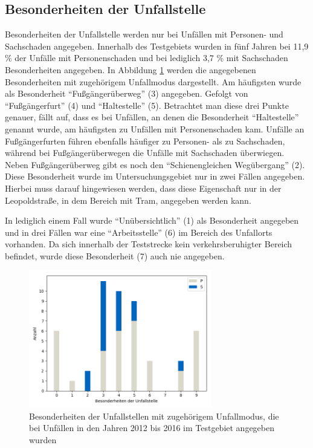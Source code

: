 \subsection{Besonderheiten der Unfallstelle}
Besonderheiten der Unfallstelle werden nur bei Unfällen mit Personen- und Sachschaden angegeben. Innerhalb des Testgebiets wurden in fünf Jahren bei 11,9 \% der Unfälle mit Personenschaden und bei lediglich 3,7 \% mit Sachschaden Besonderheiten angegeben. In Abbildung \ref{fig:BES} werden die angegebenen Besonderheiten mit zugehörigem Unfallmodus dargestellt. Am häufigsten wurde als Besonderheit \enquote{Fußgängerüberweg} (3) angegeben. Gefolgt von \enquote{Fußgängerfurt} (4) und \enquote{Haltestelle} (5). Betrachtet man diese drei Punkte genauer, fällt auf, dass es bei Unfällen, an denen die Besonderheit \enquote{Haltestelle} genannt wurde, am häufigsten zu Unfällen mit Personenschaden kam. Unfälle an Fußgängerfurten führen ebenfalls häufiger zu Personen- als zu Sachschaden, während bei Fußgängerüberwegen die Unfälle mit Sachschaden überwiegen. Neben Fußgängerüberweg gibt es noch den \enquote{Schienengleichen Wegübergang} (2). Diese Besonderheit wurde im Untersuchungsgebiet nur in zwei Fällen angegeben. Hierbei muss darauf hingewiesen werden, dass diese Eigenschaft nur in der Leopoldstraße, in dem Bereich mit Tram, angegeben werden kann.

In lediglich einem Fall wurde \enquote{Unübersichtlich} (1) als Besonderheit angegeben und in drei Fällen war eine \enquote{Arbeitsstelle} (6) im Bereich des Unfallorts vorhanden. Da sich innerhalb der Teststrecke kein verkehrsberuhigter Bereich befindet, wurde diese Besonderheit (7) auch nie angegeben. 

\begin{savenotes}
	\begin{figure}[H]
		\centering
		\includegraphics[width=8cm,height=6cm]{figures/BES}
		\caption[Besonderheiten der Unfallstelle mit zugehörigem Unfallmodus, die bei Unfällen in den Jahren 2012 bis 2016 im Testgebiet angegeben wurden]{Besonderheiten der Unfallstellen mit zugehörigem Unfallmodus, die bei Unfällen in den Jahren 2012 bis 2016 im Testgebiet angegeben wurden}\label{fig:BES}
	\end{figure}
\end{savenotes}

